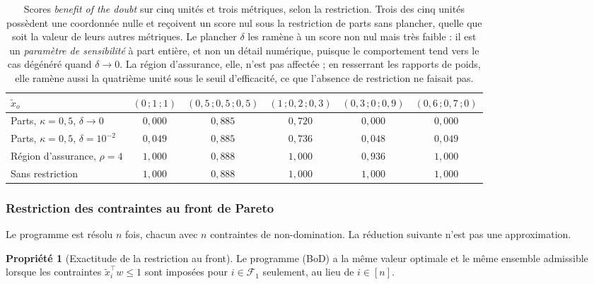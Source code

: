 \documentclass[11pt,a4paper]{article}
\theoremstyle{definition}
\newtheorem{propriete}{Propriété}[section]
\theoremstyle{remark}
\begin{document}
\begin{table}[htbp]
  \centering
  \small
  \renewcommand{\arraystretch}{1.25}
  \begin{tabular}{@{}l c c c c c@{}}
    \toprule
    $\tilde{x}_o$ & $(0\,;1\,;1)$ & $(0{,}5\,;0{,}5\,;0{,}5)$ & $(1\,;0{,}2\,;0{,}3)$ &
      $(0{,}3\,;0\,;0{,}9)$ & $(0{,}6\,;0{,}7\,;0)$ \\
    \midrule
    Parts, $\kappa = 0{,}5$, $\delta \to 0$ &
      $0{,}000$ & $0{,}885$ & $0{,}720$ & $0{,}000$ & $0{,}000$ \\
    Parts, $\kappa = 0{,}5$, $\delta = 10^{-2}$ &
      $0{,}049$ & $0{,}885$ & $0{,}736$ & $0{,}048$ & $0{,}049$ \\
    Région d'assurance, $\rho = 4$ &
      $1{,}000$ & $0{,}888$ & $1{,}000$ & $0{,}936$ & $1{,}000$ \\
    Sans restriction &
      $1{,}000$ & $0{,}888$ & $1{,}000$ & $1{,}000$ & $1{,}000$ \\
    \bottomrule
  \end{tabular}
  \caption{Scores \emph{benefit of the doubt} sur cinq unités et trois métriques, selon la
  restriction. Trois des cinq unités possèdent une coordonnée nulle et reçoivent un score
  nul sous la restriction de parts sans plancher, quelle que soit la valeur de leurs
  autres métriques. Le plancher $\delta$ les ramène à un score non nul mais très faible :
  il est un \emph{paramètre de sensibilité} à part entière, et non un détail numérique,
  puisque le comportement tend vers le cas dégénéré quand $\delta \to 0$. La région
  d'assurance, elle, n'est pas affectée ; en resserrant les rapports de poids, elle
  ramène aussi la quatrième unité sous le seuil d'efficacité, ce que l'absence de
  restriction ne faisait pas.}
  \label{tab:bod-exemple}
\end{table}

\bigskip

\subsubsection{Restriction des contraintes au front de Pareto}
\label{sec:bod-front}

\medskip

Le programme est résolu $n$ fois, chacun avec $n$ contraintes de non-domination. La
réduction suivante n'est pas une approximation.

\medskip

\begin{propriete}[Exactitude de la restriction au front]
  \label{prop:bod-front}
  Le programme (BoD) a la même valeur optimale et le même ensemble admissible lorsque les
  contraintes $\tilde{x}_i^\top w \le 1$ sont imposées pour $i \in \mathcal{F}_1$
  seulement, au lieu de $i \in [n]$.
\end{propriete}
\end{document}
